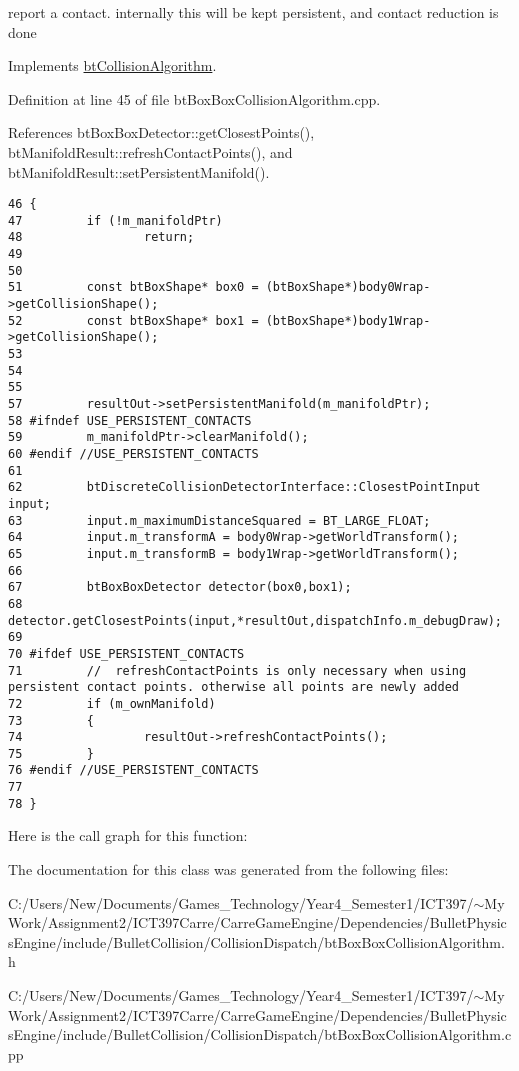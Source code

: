 report a contact. internally this will be kept persistent, and contact reduction is done 

Implements \hyperlink{classbt_collision_algorithm}{btCollisionAlgorithm}.

Definition at line 45 of file btBoxBoxCollisionAlgorithm.cpp.

References btBoxBoxDetector::getClosestPoints(), btManifoldResult::refreshContactPoints(), and btManifoldResult::setPersistentManifold().

\begin{Code}\begin{verbatim}46 {
47         if (!m_manifoldPtr)
48                 return;
49 
50         
51         const btBoxShape* box0 = (btBoxShape*)body0Wrap->getCollisionShape();
52         const btBoxShape* box1 = (btBoxShape*)body1Wrap->getCollisionShape();
53 
54 
55 
57         resultOut->setPersistentManifold(m_manifoldPtr);
58 #ifndef USE_PERSISTENT_CONTACTS 
59         m_manifoldPtr->clearManifold();
60 #endif //USE_PERSISTENT_CONTACTS
61 
62         btDiscreteCollisionDetectorInterface::ClosestPointInput input;
63         input.m_maximumDistanceSquared = BT_LARGE_FLOAT;
64         input.m_transformA = body0Wrap->getWorldTransform();
65         input.m_transformB = body1Wrap->getWorldTransform();
66 
67         btBoxBoxDetector detector(box0,box1);
68         detector.getClosestPoints(input,*resultOut,dispatchInfo.m_debugDraw);
69 
70 #ifdef USE_PERSISTENT_CONTACTS
71         //  refreshContactPoints is only necessary when using persistent contact points. otherwise all points are newly added
72         if (m_ownManifold)
73         {
74                 resultOut->refreshContactPoints();
75         }
76 #endif //USE_PERSISTENT_CONTACTS
77 
78 }
\end{verbatim}
\end{Code}




Here is the call graph for this function:

The documentation for this class was generated from the following files:\begin{CompactItemize}
\item 
C:/Users/New/Documents/Games\_\-Technology/Year4\_\-Semester1/ICT397/$\sim$My Work/Assignment2/ICT397Carre/CarreGameEngine/Dependencies/BulletPhysicsEngine/include/BulletCollision/CollisionDispatch/btBoxBoxCollisionAlgorithm.h\item 
C:/Users/New/Documents/Games\_\-Technology/Year4\_\-Semester1/ICT397/$\sim$My Work/Assignment2/ICT397Carre/CarreGameEngine/Dependencies/BulletPhysicsEngine/include/BulletCollision/CollisionDispatch/btBoxBoxCollisionAlgorithm.cpp\end{CompactItemize}
